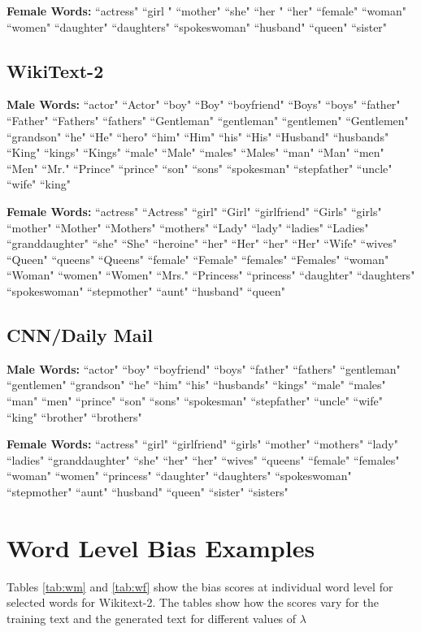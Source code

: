 \documentclass[11pt,a4paper]{article}
\begin{document}
\noindent\textbf{Female Words:} 
``actress"
``girl "
``mother"
``she"
``her "
``her"
``female"
``woman"
``women"
``daughter"
``daughters"
``spokeswoman"
``husband"
``queen"
``sister"
\subsection{WikiText-2}

\textbf{Male Words:} ``actor"
``Actor"
``boy"
``Boy"
``boyfriend"
``Boys"
``boys"
``father"
``Father"
``Fathers"
``fathers"
``Gentleman"
``gentleman"
``gentlemen"
``Gentlemen"
``grandson"
``he"
``He"
``hero"
``him"
``Him"
``his"
``His"
``Husband"
``husbands"
``King"
``kings"
``Kings"
``male"
``Male"
``males"
``Males"
``man"
``Man"
``men"
``Men"
``Mr."
``Prince"
``prince"
``son"
``sons"
``spokesman"
``stepfather"
``uncle"
``wife"
``king"


\noindent\textbf{Female Words:} 
``actress"
``Actress"
``girl"
``Girl"
``girlfriend"
``Girls"
``girls"
``mother"
``Mother"
``Mothers"
``mothers"
``Lady"
``lady"
``ladies"
``Ladies"
``granddaughter"
``she"
``She"
``heroine"
``her"
``Her"
``her"
``Her"
``Wife"
``wives"
``Queen"
``queens"
``Queens"
``female"
``Female"
``females"
``Females"
``woman"
``Woman"
``women"
``Women"
``Mrs."
``Princess"
``princess"
``daughter"
``daughters"
``spokeswoman"
``stepmother"
``aunt"
``husband"
``queen"
\subsection{CNN/Daily Mail}

\textbf{Male Words:} ``actor"
``boy"
``boyfriend"
``boys"
``father"
``fathers"
``gentleman"
``gentlemen"
``grandson"
``he"
``him"
``his"
``husbands"
``kings"
``male"
``males"
``man"
``men"
``prince"
``son"
``sons"
``spokesman"
``stepfather"
``uncle"
``wife"
``king"
``brother"
``brothers"

\noindent\textbf{Female Words:} 
``actress"
``girl"
``girlfriend"
``girls"
``mother"
``mothers"
``lady"
``ladies"
``granddaughter"
``she"
``her"
``her"
``wives"
``queens"
``female"
``females"
``woman"
``women"
``princess"
``daughter"
``daughters"
``spokeswoman"
``stepmother"
``aunt"
``husband"
``queen"
``sister"
``sisters" 


\section{Word Level Bias Examples}
 Tables \ref{tab:wm} and \ref{tab:wf} show the bias scores at individual word level for selected words for Wikitext-2. The tables show how the scores vary for the training text and the generated text for different values of  $\lambda$
\end{document}
